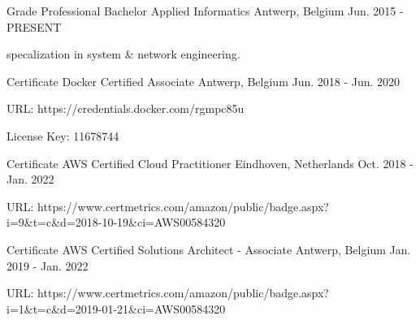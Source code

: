 

\begin{cventries}

  \cventry
    {Grade} %
    {Professional Bachelor Applied Informatics} %
    {Antwerp, Belgium} %
    {Jun. 2015 - PRESENT} %
    {
      \begin{cvitems} %
        \item {specalization in system \& network engineering.}
      \end{cvitems}
    }

  \cventry
    {Certificate} %
    {Docker Certified Associate} %
    {Antwerp, Belgium} %
    {Jun. 2018 - Jun. 2020} %
    {
      \begin{cvitems} %
        \item {URL: https://credentials.docker.com/rgmpc85u}
        \item {License Key: 11678744}
      \end{cvitems}
    }

  \cventry
    {Certificate} %
    {AWS Certified Cloud Practitioner} %
    {Eindhoven, Netherlands} %
    {Oct. 2018 - Jan. 2022} %
    {
      \begin{cvitems} %
        \item {URL: https://www.certmetrics.com/amazon/public/badge.aspx?i=9\&t=c\&d=2018-10-19\&ci=AWS00584320}
      \end{cvitems}
    }

  \cventry
    {Certificate} %
    {AWS Certified Solutions Architect - Associate } %
    {Antwerp, Belgium} %
    {Jan. 2019 - Jan. 2022} %
    {
      \begin{cvitems} %
        \item {URL: https://www.certmetrics.com/amazon/public/badge.aspx?i=1\&t=c\&d=2019-01-21\&ci=AWS00584320}
      \end{cvitems}
    }

\end{cventries}
